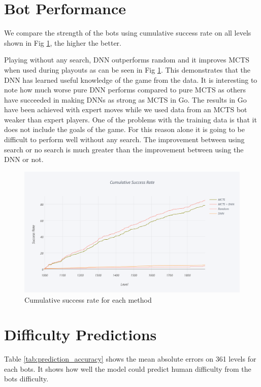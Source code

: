 \documentclass{kththesis}
\begin{document}
\section{Bot Performance}
We compare the strength of the bots using cumulative success rate on all levels shown in Fig \ref{fig:cumulative_sr}, the higher the better.

Playing without any search, DNN outperforms random and it improves MCTS when used during playouts as can be seen in Fig \ref{fig:cumulative_sr}. This demonstrates  that the DNN has learned useful knowledge of the game from the data. It is interesting to note how much worse pure DNN performs compared to pure MCTS as others have succeeded in making DNNs as strong as MCTS in Go. The results in Go have been achieved with expert moves while we used data from an MCTS bot weaker than expert players. One of the problems with the training data is that it does not include the goals of the game. For this reason alone it is going to be difficult to perform well without any search. The improvement between using search or no search is much greater than the improvement between using the DNN or not.

\begin{figure}[!htb]
\centering
\includegraphics[width=\textwidth]{images/cumulative_sr.png}
\caption{Cumulative success rate for each method}
\label{fig:cumulative_sr}
\end{figure}


\section{Difficulty Predictions}
Table \ref{tab:prediction_accuracy} shows the mean absolute errors on 361 levels for each bots. It shows how well the model could predict human difficulty from the bots difficulty. 
\end{document}
